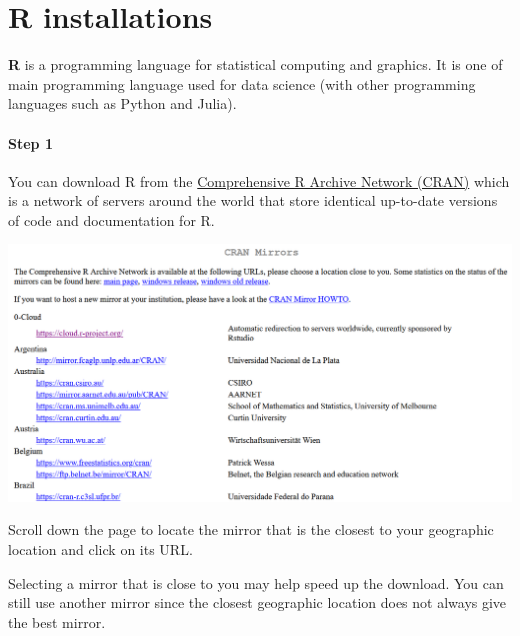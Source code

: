 \documentclass[
  letterpaper,
  DIV=11,
  numbers=noendperiod]{scrreprt}
\begin{document}
\appendix
{}

\hypertarget{r-installations}{%
\chapter{R installations}\label{r-installations}}

\textbf{R} is a programming language for statistical computing and
graphics. It is one of main programming language used for data science
(with other programming languages such as Python and Julia).

\hypertarget{step-1-1}{%
\subsubsection{Step 1}\label{step-1-1}}

You can download R from the
\href{https://cran.r-project.org/mirrors.html}{Comprehensive R Archive
Network (CRAN)} which is a network of servers around the world that
store identical up-to-date versions of code and documentation for R.

\includegraphics{./images/paste-13103C13.png}

Scroll down the page to locate the mirror that is the closest to your
geographic location and click on its URL.

\begin{tcolorbox}[enhanced jigsaw, colframe=quarto-callout-tip-color-frame, colback=white, rightrule=.15mm, bottomrule=.15mm, left=2mm, arc=.35mm, coltitle=black, title=\textcolor{quarto-callout-tip-color}{\faLightbulb}\hspace{0.5em}{Tip}, opacitybacktitle=0.6, bottomtitle=1mm, opacityback=0, toptitle=1mm, toprule=.15mm, colbacktitle=quarto-callout-tip-color!10!white, titlerule=0mm, leftrule=.75mm, breakable]
Selecting a mirror that is close to you may help speed up the download.
You can still use another mirror since the closest geographic location
does not always give the best mirror.
\end{tcolorbox}
\end{document}
